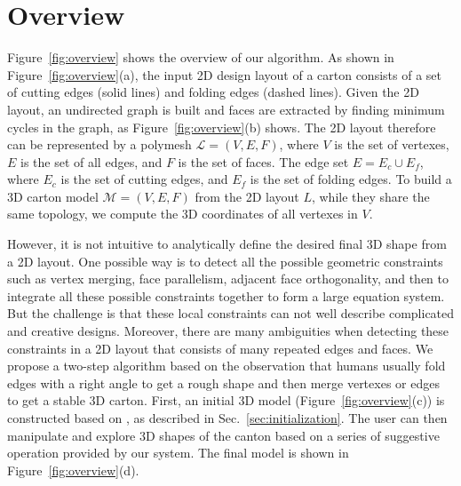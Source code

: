 \section{Overview}\label{sec:overview}




 
Figure~\ref{fig:overview} shows the overview of our algorithm. 
As shown in Figure~\ref{fig:overview}(a), the input 2D design layout of a carton consists of a set of cutting edges (solid lines) and folding edges (dashed lines).
%
Given the 2D layout, an undirected graph is built and faces are extracted by finding minimum cycles in the graph, as Figure~\ref{fig:overview}(b) shows. 
The 2D layout therefore can be represented by a polymesh $\mathcal{L}=(V,E,F)$, where $V$ is the set of vertexes, $E$ is the set of all edges, and $F$ is the set of faces. 
The edge set $E=E_c\cup E_f$, where $E_c$ is the set of cutting edges, and $E_f$ is the set of folding edges.
%
To build a 3D carton model $\mathcal{M}=(V, E, F)$ from the 2D layout $L$, while they share the same topology, we compute the 3D coordinates of all vertexes in $V$. 
%

However, it is not intuitive to analytically define the desired final 3D shape from a 2D layout. 
One possible way is to detect all the possible geometric constraints such as vertex merging, face parallelism, adjacent face orthogonality, and then to integrate all these possible constraints together to form a large equation system. 
But the challenge is that these local constraints can not well describe complicated and creative designs. 
Moreover, there are many ambiguities when detecting these constraints in a 2D layout that consists of many repeated edges and faces. 
%
We propose a two-step algorithm based on the observation that humans usually fold edges with a right angle to get a rough shape and then merge vertexes or edges to get a stable 3D carton.
First, an initial 3D model (Figure~\ref{fig:overview}(c)) is constructed based on , as described in Sec.~\ref{sec:initialization}.
The user can then manipulate and explore 3D shapes of the canton based on a series of suggestive operation provided by our system. 
%
The final model is shown in Figure~\ref{fig:overview}(d).



